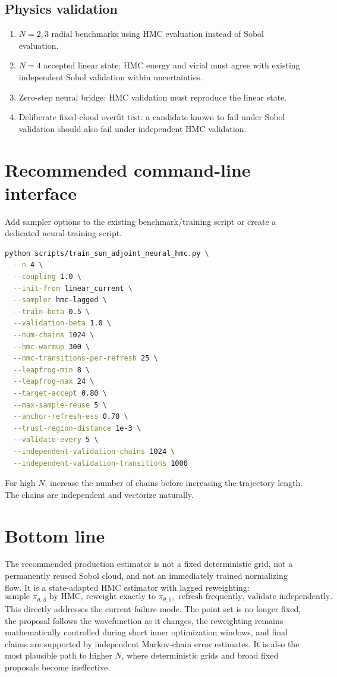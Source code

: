 \documentclass[11pt]{article}
\begin{document}
\subsection{Physics validation}
\begin{enumerate}[label=(\roman*)]
\item $N=2,3$ radial benchmarks using HMC evaluation instead of Sobol evaluation.
\item $N=4$ accepted linear state: HMC energy and virial must agree with existing independent Sobol validation within uncertainties.
\item Zero-step neural bridge: HMC validation must reproduce the linear state.
\item Deliberate fixed-cloud overfit test: a candidate known to fail under Sobol validation should also fail under independent HMC validation.
\end{enumerate}

\section{Recommended command-line interface}

Add sampler options to the existing benchmark/training script or create a dedicated neural-training script.

\begin{lstlisting}[language=bash]
python scripts/train_sun_adjoint_neural_hmc.py \
  --n 4 \
  --coupling 1.0 \
  --init-from linear_current \
  --sampler hmc-lagged \
  --train-beta 0.5 \
  --validation-beta 1.0 \
  --num-chains 1024 \
  --hmc-warmup 300 \
  --hmc-transitions-per-refresh 25 \
  --leapfrog-min 8 \
  --leapfrog-max 24 \
  --target-accept 0.80 \
  --max-sample-reuse 5 \
  --anchor-refresh-ess 0.70 \
  --trust-region-distance 1e-3 \
  --validate-every 5 \
  --independent-validation-chains 1024 \
  --independent-validation-transitions 1000
\end{lstlisting}

For high $N$, increase the number of chains before increasing the trajectory length.  The chains are independent and vectorize naturally.

\section{Bottom line}

The recommended production estimator is not a fixed deterministic grid, not a permanently reused Sobol cloud, and not an immediately trained normalizing flow.  It is a state-adapted HMC estimator with lagged reweighting:
\begin{equation}
 \boxed{
 \text{sample }\pi_{\bar\theta,\beta}\text{ by HMC, reweight exactly to }\pi_{\theta,1},\text{ refresh frequently, validate independently.}
 }
\end{equation}
This directly addresses the current failure mode.  The point set is no longer fixed, the proposal follows the wavefunction as it changes, the reweighting remains mathematically controlled during short inner optimization windows, and final claims are supported by independent Markov-chain error estimates.  It is also the most plausible path to higher $N$, where deterministic grids and broad fixed proposals become ineffective.
\end{document}
